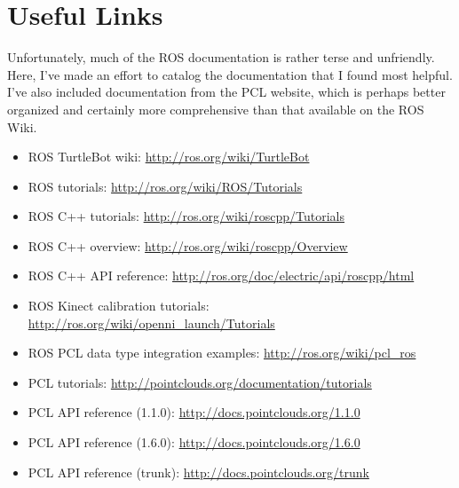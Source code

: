 \documentclass[12pt]{report}
\begin{document}
\section{Useful Links}
Unfortunately, much of the ROS documentation is rather terse and unfriendly.  Here, I've made an effort to catalog the documentation that I found most helpful.  I've also included documentation from the PCL website, which is perhaps better organized and certainly more comprehensive than that available on the ROS Wiki.
\begin{sloppypar}
\begin{itemize}
\item{ROS TurtleBot wiki: \url{http://ros.org/wiki/TurtleBot}}
\item{ROS tutorials: \url{http://ros.org/wiki/ROS/Tutorials}}
\item{ROS C++ tutorials: \url{http://ros.org/wiki/roscpp/Tutorials}}
\item{ROS C++ overview: \url{http://ros.org/wiki/roscpp/Overview}}
\item{ROS C++ API reference: \url{http://ros.org/doc/electric/api/roscpp/html}}
\item{ROS Kinect calibration tutorials: \url{http://ros.org/wiki/openni_launch/Tutorials}}
\item{ROS PCL data type integration examples: \url{http://ros.org/wiki/pcl_ros}}
\item{PCL tutorials: \url{http://pointclouds.org/documentation/tutorials}}
\item{PCL API reference (1.1.0): \url{http://docs.pointclouds.org/1.1.0}}
\item{PCL API reference (1.6.0): \url{http://docs.pointclouds.org/1.6.0}}
\item{PCL API reference (trunk): \url{http://docs.pointclouds.org/trunk}}
\end{itemize}
\end{sloppypar}
\end{document}
